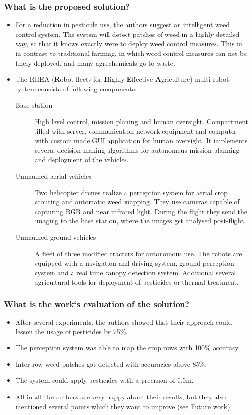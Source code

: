     \subsubsection*{What is the proposed solution?}
    \begin{itemize}
        \item For a reduction in pesticide use, the authors suggest an intelligent weed control system. The system will detect patches of weed in a highly detailed way, so that it knows exactly were to deploy weed control measures. This in in contrast to traditional farming, in which weed control measures can not be finely deployed, and many agrochemicals go to waste.
        \item The RHEA (\textbf{R}obot fleets for \textbf{H}ighly \textbf{E}ffective \textbf{A}griculture) multi-robot system consists of following components: \ \begin{description}
            \item[Base station]  High level control, mission planing and human oversight. Compartment filled with server, communication network equipment and computer with custom made GUI application for human oversight. It implements several decision-making algorithms for autonomous mission planning and deployment of the vehicles.
            \item[Unmanned aerial vehicles] Two helicopter drones realize a perception system for aerial crop scouting and automatic weed mapping. They use cameras capable of capturing RGB and near infrared light. During the flight they send the imaging to the base station, where the images get analysed post-flight.
            \item[Unmanned ground vehicles] A fleet of three modified tractors for autonomous use. The robots are equipped with a navigation and driving system, ground perception system and a real time canopy detection system. Additional several agricultural tools for deployment of pesticides or thermal treatment.
        \end{description}
    \end{itemize}
    \subsubsection*{What is the work`s evaluation of the solution?}
    \begin{itemize}
        \item After several experiments, the authors showed that their approach could lessen the usage of pesticides by 75\%.
        \item The perception system was able to map the crop rows with 100\% accuracy.
        \item Inter-row weed patches got detected with accuracies above 85\%.
        \item The system could apply pesticides with a precision of 0.5m.
        \item All in all the authors are very happy about their results, but they also mentioned several points which they want to improve (see Future work)
    \end{itemize}
